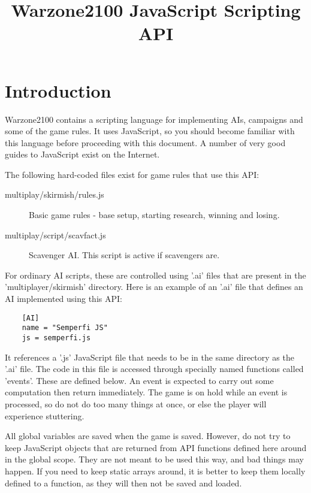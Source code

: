 \documentclass[12pt]{article}
\title{Warzone2100 JavaScript Scripting API}
\date{}
\begin{document}
\maketitle

\section{Introduction}

Warzone2100 contains a scripting language for implementing AIs, campaigns and some of the game
rules. It uses JavaScript, so you should become familiar with this language before proceeding
with this document. A number of very good guides to JavaScript exist on the Internet.

The following hard-coded files exist for game rules that use this API:

\begin{description}
	\item[multiplay/skirmish/rules.js] Basic game rules - base setup, starting research, winning and losing.
	\item[multiplay/script/scavfact.js] Scavenger AI. This script is active if scavengers are.
\end{description}

For ordinary AI scripts, these are controlled using '.ai' files that are present in the 'multiplayer/skirmish'
directory. Here is an example of an '.ai' file that defines an AI implemented using this API:

\begin{verbatim}
	[AI]
	name = "Semperfi JS"
	js = semperfi.js
\end{verbatim}

It references a '.js' JavaScript file that needs to be in the same directory as the '.ai' file. The code in
this file is accessed through specially named functions called 'events'. These are defined below. An event
is expected to carry out some computation then return immediately. The game is on hold while an event is processed,
so do not do too many things at once, or else the player will experience stuttering.

All global variables are saved when the game is saved. However, do not try to keep JavaScript objects that are
returned from API functions defined here around in the global scope. They are not meant to be used this way, and
bad things may happen. If you need to keep static arrays around, it is better to keep them locally defined to a
function, as they will then not be saved and loaded.
\end{document}
